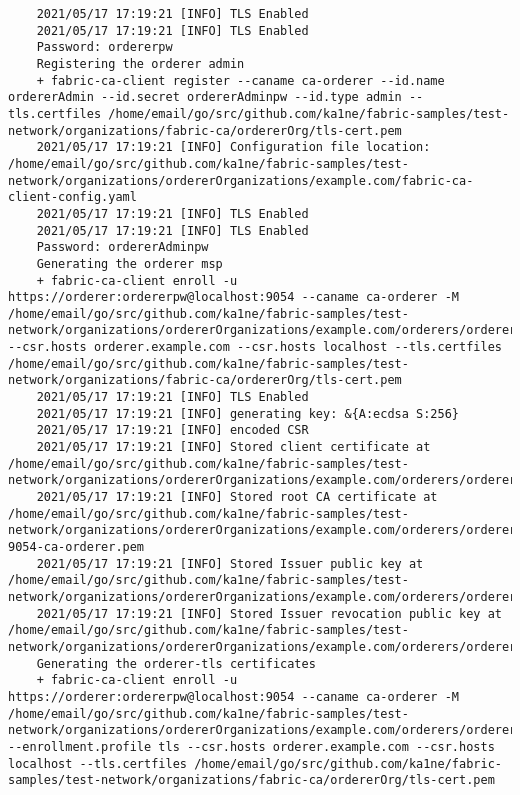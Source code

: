 \begin{lstlisting}
    2021/05/17 17:19:21 [INFO] TLS Enabled
    2021/05/17 17:19:21 [INFO] TLS Enabled
    Password: ordererpw
    Registering the orderer admin
    + fabric-ca-client register --caname ca-orderer --id.name ordererAdmin --id.secret ordererAdminpw --id.type admin --tls.certfiles /home/email/go/src/github.com/ka1ne/fabric-samples/test-network/organizations/fabric-ca/ordererOrg/tls-cert.pem
    2021/05/17 17:19:21 [INFO] Configuration file location: /home/email/go/src/github.com/ka1ne/fabric-samples/test-network/organizations/ordererOrganizations/example.com/fabric-ca-client-config.yaml
    2021/05/17 17:19:21 [INFO] TLS Enabled
    2021/05/17 17:19:21 [INFO] TLS Enabled
    Password: ordererAdminpw
    Generating the orderer msp
    + fabric-ca-client enroll -u https://orderer:ordererpw@localhost:9054 --caname ca-orderer -M /home/email/go/src/github.com/ka1ne/fabric-samples/test-network/organizations/ordererOrganizations/example.com/orderers/orderer.example.com/msp --csr.hosts orderer.example.com --csr.hosts localhost --tls.certfiles /home/email/go/src/github.com/ka1ne/fabric-samples/test-network/organizations/fabric-ca/ordererOrg/tls-cert.pem
    2021/05/17 17:19:21 [INFO] TLS Enabled
    2021/05/17 17:19:21 [INFO] generating key: &{A:ecdsa S:256}
    2021/05/17 17:19:21 [INFO] encoded CSR
    2021/05/17 17:19:21 [INFO] Stored client certificate at /home/email/go/src/github.com/ka1ne/fabric-samples/test-network/organizations/ordererOrganizations/example.com/orderers/orderer.example.com/msp/signcerts/cert.pem
    2021/05/17 17:19:21 [INFO] Stored root CA certificate at /home/email/go/src/github.com/ka1ne/fabric-samples/test-network/organizations/ordererOrganizations/example.com/orderers/orderer.example.com/msp/cacerts/localhost-9054-ca-orderer.pem
    2021/05/17 17:19:21 [INFO] Stored Issuer public key at /home/email/go/src/github.com/ka1ne/fabric-samples/test-network/organizations/ordererOrganizations/example.com/orderers/orderer.example.com/msp/IssuerPublicKey
    2021/05/17 17:19:21 [INFO] Stored Issuer revocation public key at /home/email/go/src/github.com/ka1ne/fabric-samples/test-network/organizations/ordererOrganizations/example.com/orderers/orderer.example.com/msp/IssuerRevocationPublicKey
    Generating the orderer-tls certificates
    + fabric-ca-client enroll -u https://orderer:ordererpw@localhost:9054 --caname ca-orderer -M /home/email/go/src/github.com/ka1ne/fabric-samples/test-network/organizations/ordererOrganizations/example.com/orderers/orderer.example.com/tls --enrollment.profile tls --csr.hosts orderer.example.com --csr.hosts localhost --tls.certfiles /home/email/go/src/github.com/ka1ne/fabric-samples/test-network/organizations/fabric-ca/ordererOrg/tls-cert.pem

\end{lstlisting}

